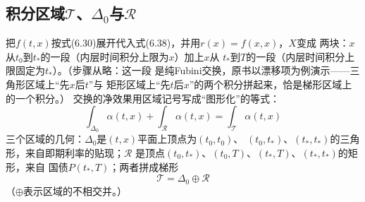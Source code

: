 \subsection*{积分区域$\mathcal{T}$、$\Delta_0$与$\mathcal{R}$}

把$f(t,x)$按式(6.30)展开代入式(6.38)，并用$r(x)=f(x,x)$，$X$变成
两块：$x$从$t_0$到$t_*$的一段（内层时间积分上限为$x$）加上$x$从
$t_*$到$T$的一段（内层时间积分上限固定为$t_*$）。（步骤从略：这一段
是纯Fubini交换，原书以漂移项为例演示——三角形区域上“先$x$后$t$”与
矩形区域上“先$t$后$x$”的两个积分拼起来，恰是梯形区域上的一个积分。）
交换的净效果用区域记号写成“图形化”的等式：
\begin{equation*}
\int_{\Delta_0}\alpha(t,x)+\int_{\mathcal{R}}\alpha(t,x)
=\int_{\mathcal{T}}\alpha(t,x)
\tag{6.39}
\end{equation*}
三个区域的几何：$\Delta_0$是$(t,x)$平面上顶点为$(t_0,t_0)$、
$(t_0,t_*)$、$(t_*,t_*)$的三角形，来自即期利率的贴现；$\mathcal{R}$
是顶点$(t_0,t_*)$、$(t_0,T)$、$(t_*,T)$、$(t_*,t_*)$的矩形，来自
国债$P(t_*,T)$；两者拼成梯形
\begin{equation*}
\mathcal{T}=\Delta_0\oplus\mathcal{R}
\end{equation*}
（$\oplus$表示区域的不相交并。）




